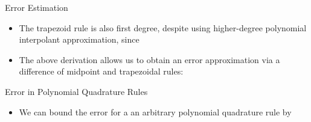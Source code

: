 \begin{frame}{Error Estimation}

\begin{itemize}

\item The trapezoid rule is also first degree, despite using higher-degree polynomial interpolant approximation, since 
\item The above derivation allows us to obtain an error approximation via a difference of midpoint and trapezoidal rules:
\end{itemize}
\end{frame}

\begin{frame}{Error in Polynomial Quadrature Rules}

\begin{itemize}


\item We can bound the error for a an arbitrary polynomial quadrature rule by
\lgcond{
}

\end{itemize}

\end{frame}

